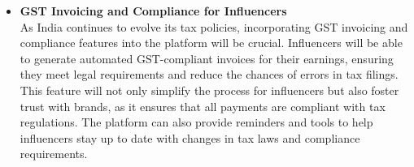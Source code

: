 \begin{justify}
\begin{itemize}
    \item \textbf{GST Invoicing and Compliance for Influencers} \\
    As India continues to evolve its tax policies, incorporating GST invoicing and compliance features into the platform will be crucial. Influencers will be able to generate automated GST-compliant invoices for their earnings, ensuring they meet legal requirements and reduce the chances of errors in tax filings. This feature will not only simplify the process for influencers but also foster trust with brands, as it ensures that all payments are compliant with tax regulations. The platform can also provide reminders and tools to help influencers stay up to date with changes in tax laws and compliance requirements.
\end{itemize}



\end{justify}
